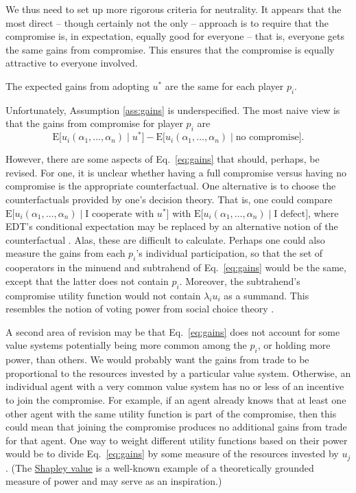 We thus need to set up more rigorous criteria for neutrality. It appears
that the most direct -- though certainly not the only -- approach is to
require that the compromise is, in expectation, equally good for
everyone -- that is, everyone gets the same gains from compromise. This
ensures that the compromise is equally attractive to everyone involved.

\begin{assumption}
\label{ass:gains}
The expected gains from adopting \(u^{*}\) are the same for each player \(p_{i}\).
\end{assumption}

Unfortunately, Assumption \ref{ass:gains} is underspecified. The most naive view is that the gains
from compromise for player \(p_{i}\) are
\begin{equation}
\mathrm{E}\lbrack u_{i}(\alpha_{1},\dotsc,\alpha_{n})\mid u^{*}\rbrack - \mathrm{E}\lbrack
u_{i}(\alpha_{1},\dotsc,\alpha_{n})\mid \text{no compromise}\rbrack.
    \label{eq:gains}
\end{equation}

However, there are some aspects of Eq.~\eqref{eq:gains} that should, perhaps, be revised.
For one, it is unclear whether having a full compromise versus having no
compromise is the appropriate counterfactual. One alternative is to
choose the counterfactuals provided by one's decision theory. That is,
one could compare
\(\mathrm{E}\lbrack u_{i}(\alpha_{1},\dotsc,\alpha_{n})\mid \text{I cooperate with }u^{*}\rbrack\)
with \(\mathrm{E}\lbrack u_{i}(\alpha_{1},\dotsc,\alpha_{n})\mid \text{I defect}\rbrack\),
where EDT's conditional expectation may be replaced by an alternative
notion of the counterfactual
\parencite{Gibbard1978-nw,Hintze2014-ha}. Alas, these are
difficult to calculate. Perhaps one could also measure the gains from
each \(p_i\)'s individual participation, so that the set of
cooperators in the minuend and subtrahend of Eq.~\eqref{eq:gains} would be the same,
except that the latter does not contain \(p_{i}\). Moreover, the
subtrahend's compromise utility function would not contain
\(\lambda_{i}u_{i}\) as a summand. This resembles the notion of voting
power from social choice theory
\parencite{Cotton-Barratt2013-ql,Felsenthal1998-zv}.

A second area of revision may be that Eq.~\eqref{eq:gains} does not account for some
value systems potentially being more common among the \(p_{i}\), or
holding more power, than others. We would probably want the gains from
trade to be proportional to the resources invested by a particular value
system. Otherwise, an individual agent with a very common value system
has no or less of an incentive to join the compromise. For example, if
an agent already knows that at least one other agent with the same
utility function is part of the compromise, then this could mean that
joining the compromise produces no additional gains from trade for that
agent. One way to weight different utility functions based on their
power would be to divide Eq.~\eqref{eq:gains} by some measure of the resources invested
by \(u_{j}\). (The
\href{https://en.wikipedia.org/wiki/Shapley_value}{Shapley value}
is a well-known example of a theoretically grounded measure of power and
may serve as an inspiration.)

